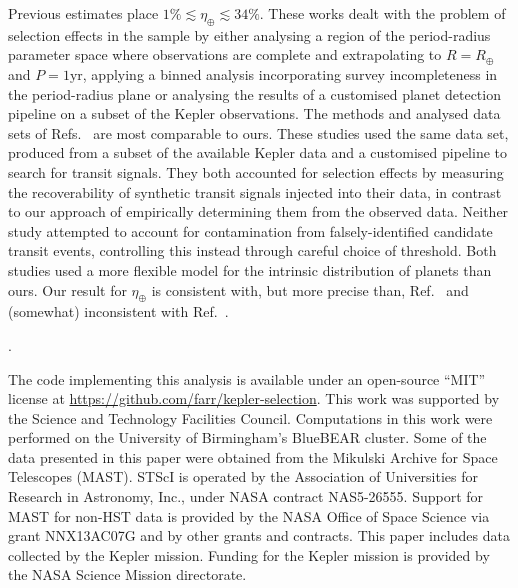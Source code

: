 \documentclass[12pt]{article}
\newcounter{lastnote}
\newenvironment{scilastnote}{%
\setcounter{lastnote}{\value{enumiv}}%
\addtocounter{lastnote}{+1}%
\begin{list}%
{\arabic{lastnote}.}
{\setlength{\leftmargin}{.22in}}
{\setlength{\labelsep}{.5em}}}
{\end{list}}
\newcommand{\etaearth}{\eta_\oplus}
\newcommand{\REarth}{R_\oplus}
\begin{document}
Previous
estimates\cite{Catanzarite2011,Traub2012,Dong2013,Petigura2013,Foreman-Mackey2014}
place $1\% \lesssim \etaearth \lesssim 34\%$.  These works dealt with
the problem of selection effects in the sample by either analysing a
region of the period-radius parameter space where observations are
complete and extrapolating to $R = \REarth$ and $P = 1
\mathrm{yr}$\cite{Catanzarite2011,Traub2012}, applying a binned
analysis incorporating survey incompleteness in the period-radius
plane\cite{Dong2013,Petigura2013} or analysing the results of a
customised planet detection pipeline on a subset of the Kepler
observations\cite{Petigura2013,Foreman-Mackey2014}.  The methods and
analysed data sets of Refs.\ \cite{Petigura2013,Foreman-Mackey2014}
are most comparable to ours.  These studies used the same data set,
produced\cite{Petigura2013} from a subset of the available Kepler data
and a customised pipeline to search for transit signals.  They both
accounted for selection effects by measuring the recoverability of
synthetic transit signals injected into their data, in contrast to our
approach of empirically determining them from the observed data.
Neither study attempted to account for contamination from
falsely-identified candidate transit events, controlling this instead
through careful choice of threshold.  Both studies used a more
flexible model for the intrinsic distribution of planets than ours.
Our result for $\etaearth$ is consistent with, but more precise than,
Ref.\ \cite{Foreman-Mackey2014} and (somewhat) inconsistent with
Ref.\ \cite{Petigura2013}.





\begin{scilastnote}
\item The code implementing this analysis is available under an
  open-source ``MIT'' license at
  \url{https://github.com/farr/kepler-selection}.  This work was
  supported by the Science and Technology Facilities Council.
  Computations in this work were performed on the University of
  Birmingham's BlueBEAR cluster.  Some of the data presented in
  this paper were obtained from the Mikulski Archive for Space
  Telescopes (MAST). STScI is operated by the Association of
  Universities for Research in Astronomy, Inc., under NASA contract
  NAS5-26555. Support for MAST for non-HST data is provided by the
  NASA Office of Space Science via grant NNX13AC07G and by other
  grants and contracts.  This paper includes data collected by the
  Kepler mission. Funding for the Kepler mission is provided by the
  NASA Science Mission directorate.
\end{scilastnote}
\end{document}
